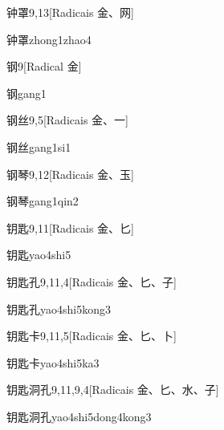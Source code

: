 \begin{entry}{钟罩}{9,13}[Radicais ⾦、⽹]
  \begin{phonetics}{钟罩}{zhong1zhao4}
  \end{phonetics}
\end{entry}

\begin{entry}{钢}{9}[Radical ⾦]
  \begin{phonetics}{钢}{gang1}
  \end{phonetics}
\end{entry}

\begin{entry}{钢丝}{9,5}[Radicais ⾦、⼀]
  \begin{phonetics}{钢丝}{gang1si1}
  \end{phonetics}
\end{entry}

\begin{entry}{钢琴}{9,12}[Radicais ⾦、⽟]
  \begin{phonetics}{钢琴}{gang1qin2}
  \end{phonetics}
\end{entry}

\begin{entry}{钥匙}{9,11}[Radicais ⾦、⼔]
  \begin{phonetics}{钥匙}{yao4shi5}
  \end{phonetics}
\end{entry}

\begin{entry}{钥匙孔}{9,11,4}[Radicais ⾦、⼔、⼦]
  \begin{phonetics}{钥匙孔}{yao4shi5kong3}
  \end{phonetics}
\end{entry}

\begin{entry}{钥匙卡}{9,11,5}[Radicais ⾦、⼔、⼘]
  \begin{phonetics}{钥匙卡}{yao4shi5ka3}
  \end{phonetics}
\end{entry}

\begin{entry}{钥匙洞孔}{9,11,9,4}[Radicais ⾦、⼔、⽔、⼦]
  \begin{phonetics}{钥匙洞孔}{yao4shi5dong4kong3}
  \end{phonetics}
\end{entry}

